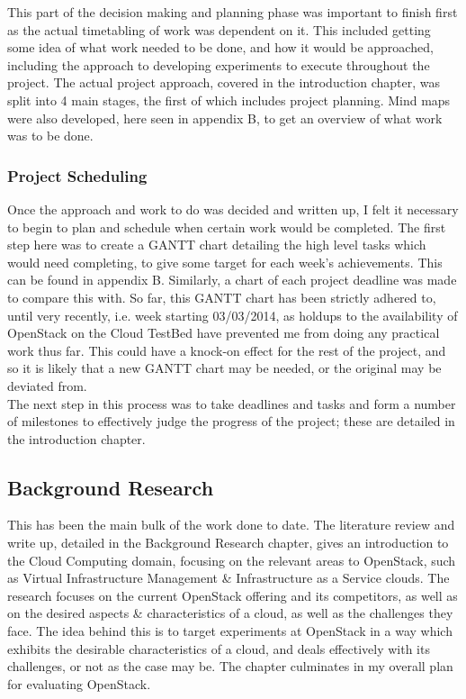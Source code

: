 This part of the decision making and planning phase was important to finish first as the actual timetabling of work was dependent on it. This included getting some idea of what work needed to be done, and how it would be approached, including the approach to developing experiments to execute throughout the project. The actual project approach, covered in the introduction chapter, was split into 4 main stages, the first of which includes project planning. Mind maps were also developed, here seen in appendix B, to get an overview of what work was to be done. 

\subsubsection{Project Scheduling}

Once the approach and work to do was decided and written up, I felt it necessary to begin to plan and schedule when certain work would be completed. The first step here was to create a GANTT chart detailing the high level tasks which would need completing, to give some target for each week's achievements. This can be found in appendix B. Similarly, a chart of each project deadline was made to compare this with. So far, this GANTT chart has been strictly adhered to, until very recently, i.e. week starting 03/03/2014, as holdups to the availability of OpenStack on the Cloud TestBed have prevented me from doing any practical work thus far. This could have a knock-on effect for the rest of the project, and so it is likely that a new GANTT chart may be needed, or the original may be deviated from. \\
The next step in this process was to take deadlines and tasks and form a number of milestones to effectively judge the progress of the project; these are detailed in the introduction chapter. 

\subsection{Background Research} 

This has been the main bulk of the work done to date. The literature review and write up, detailed in the Background Research chapter, gives an introduction to the Cloud Computing domain, focusing on the relevant areas to OpenStack, such as Virtual Infrastructure Management \& Infrastructure as a Service clouds. The research focuses on the current OpenStack offering and its competitors, as well as on the desired aspects \& characteristics of a cloud, as well as the challenges they face. The idea behind this is to target experiments at OpenStack in a way which exhibits the desirable characteristics of a cloud, and deals effectively with its challenges, or not as the case may be. The chapter culminates in my overall plan for evaluating OpenStack. 

